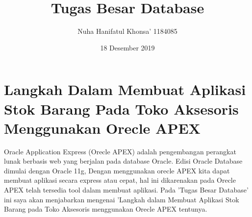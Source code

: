 \documentclass[a4paper,12pt]{report}
\title{Tugas Besar Database}
\author{Nuha Hanifatul Khonsa' 1184085}
\date{18 Desember 2019}
\begin{document}
\maketitle


\section{Langkah Dalam Membuat Aplikasi Stok Barang Pada Toko Aksesoris Menggunakan Orecle APEX}
\par Oracle Application Express (Orecle APEX) adalah pengembangan perangkat lunak berbasis web yang berjalan pada database Oracle. Edisi Oracle Database dimulai dengan Oracle 11g, Dengan menggunakan orecle APEX kita dapat membuat aplikasi secara express atau cepat, hal ini dikarenakan pada Orecle APEX telah tersedia tool dalam membuat aplikasi. Pada 'Tugas Besar Database' ini saya akan menjabarkan mengenai 'Langkah dalam Membuat Aplikasi Stok Barang pada Toko Aksesoris menggunakan Orecle APEX tentunya.
\end{document}
